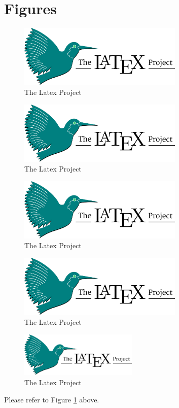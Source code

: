 \documentclass{article}
\begin{document}
\section{Figures}

\blindtext
\begin{figure}[h]
    \begin{center}
        \includegraphics[width=0.7\textwidth]{LaTeX_project_logo_bird.svg.png}
        \caption{The Latex Project}
    \end{center}
\end{figure}

\blindtext
\begin{figure}[t]
    \centering
    \includegraphics[width=0.7\textwidth]{LaTeX_project_logo_bird.svg.png}
    \caption{The Latex Project}
\end{figure}

\blindtext
\begin{figure}[h]
    \centering
    \includegraphics[width=0.7\textwidth]{LaTeX_project_logo_bird.svg.png}
    \caption{The Latex Project}
\end{figure}

\blindtext
\begin{figure}[h]
    \centering
    \includegraphics[width=0.7\textwidth]{LaTeX_project_logo_bird.svg.png}
    \caption{The Latex Project}
\end{figure}

\blindtext

\begin{figure}
    \centering
    \includegraphics[width=0.5\textwidth]{LaTeX_project_logo_bird.svg.png}
    \caption{The Latex Project\label{latexproj}}
\end{figure}
\blindtext
Please refer to Figure \ref{latexproj} above.
\end{document}
